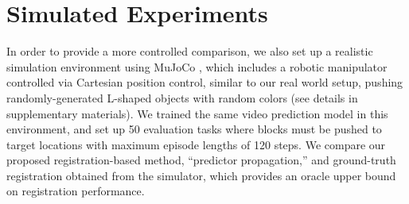 \section{Simulated Experiments}

In order to provide a more controlled comparison, we also set up a realistic simulation environment using MuJoCo \cite{todorov2012mujoco}, which includes a robotic manipulator controlled via Cartesian position control, similar to our real world setup, pushing randomly-generated L-shaped objects with random colors (see details in supplementary materials). 
We trained the same video prediction model in this environment, and set up 50 evaluation tasks where blocks must be pushed to target locations with maximum episode lengths of 120 steps. 
We  compare our proposed registration-based method, ``predictor propagation,'' and ground-truth registration obtained from the simulator, which provides an oracle upper bound on registration performance. 





